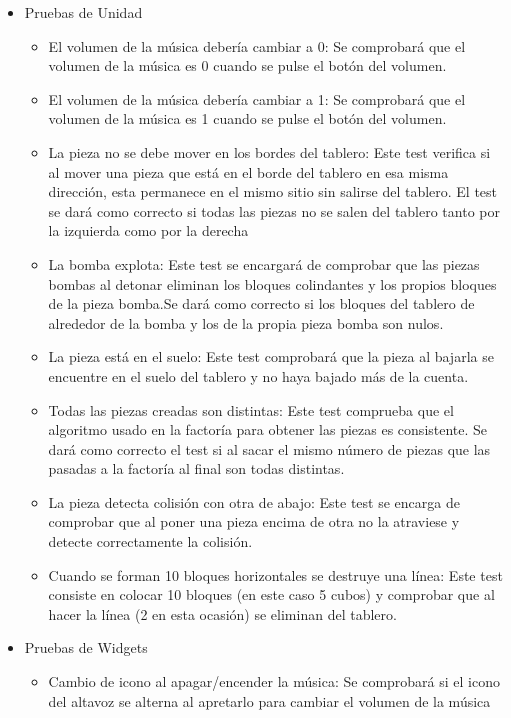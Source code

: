 \documentclass{article}
\begin{document}
\begin{itemize}
    \item Pruebas de Unidad
    \begin{itemize}
      \item El volumen de la música debería cambiar a 0: Se comprobará que el volumen de la música es 0 cuando se pulse el botón del volumen.
    
      \item El volumen de la música debería cambiar a 1: Se comprobará que el volumen de la música es 1 cuando se pulse el botón del volumen.
      
      \item La pieza no se debe mover en los bordes del tablero: Este test verifica si al mover una pieza que está en el borde del tablero en esa misma dirección, esta permanece en el mismo sitio sin salirse del tablero. El test se dará como correcto si todas las piezas no se salen del tablero tanto por la izquierda como por la derecha
      
      \item La bomba explota: Este test se encargará de comprobar que las piezas bombas al detonar eliminan los bloques colindantes y los propios bloques de la pieza bomba.Se dará como correcto si los bloques del tablero de alrededor de la bomba y los de la propia pieza bomba son nulos.
      
      \item La pieza está en el suelo: Este test comprobará que la pieza al bajarla se encuentre en el suelo del tablero y no haya bajado más de la cuenta.
  
      \item Todas las piezas creadas son distintas: Este test comprueba que el algoritmo usado en la factoría para obtener las piezas es consistente. Se dará como correcto el test si al sacar el mismo número de piezas que las pasadas a la factoría al final son todas distintas.
    
      \item La pieza detecta colisión con otra de abajo: Este test se encarga de comprobar que al poner una pieza encima de otra no la atraviese y detecte correctamente la colisión.
  
      \item Cuando se forman 10 bloques horizontales se destruye una línea: Este test consiste en colocar 10 bloques (en este caso 5 cubos) y comprobar que al hacer la línea (2 en esta ocasión) se eliminan del tablero.
    \end{itemize}
    \item Pruebas de Widgets
    \begin{itemize}
    \item Cambio de icono al apagar/encender la música: Se comprobará si el icono del altavoz se alterna al apretarlo para cambiar el volumen de la música
    

\end{itemize}
\end{itemize}
\end{document}

